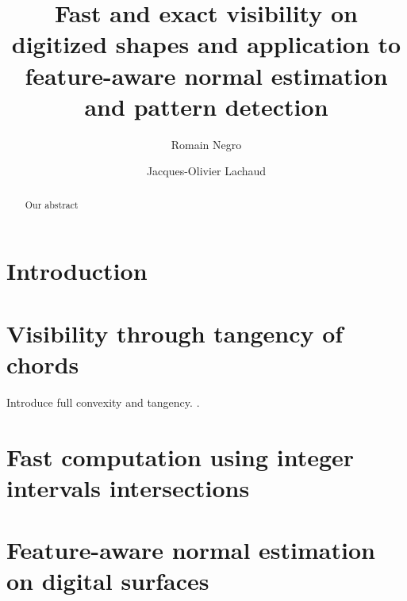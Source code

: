 \documentclass[runningheads]{llncs}
\begin{document}
%
\title{Fast and exact visibility on digitized shapes and application to feature-aware normal estimation and pattern detection}
%
%
\author{Romain Negro \and
  Jacques-Olivier Lachaud}
%
%
%
\maketitle              %
%
\begin{abstract}
  Our abstract
\end{abstract}

\section{Introduction}

\section{Visibility through tangency of chords}

Introduce full convexity and tangency. \cite{lachaud:2021-dgmm,Lachaud:2022-jmiv}.

\section{Fast computation using integer intervals intersections}

\section{Feature-aware normal estimation on digital surfaces}
\end{document}
